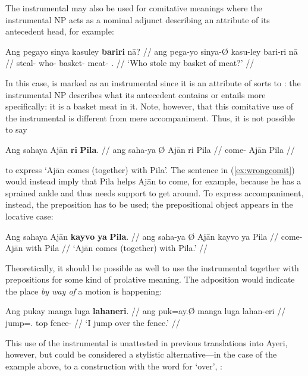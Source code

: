 \xe

The instrumental may also be used for comitative meanings where the
instrumental NP acts as a nominal adjunct describing an attribute of its
antecedent head, for example:

\ex\begingl
	\gla Ang pegayo sinya kasuley \textbf{bariri} nā? //
	\glb ang pega-yo sinya-Ø kasu-ley bari-ri nā //
	\glc \AgtT{} steal-\TsgN{} who-\Top{} basket-\PargI{} 
		meat-\Ins{} \Fsg{}.\Gen{} //
	\glft `Who stole my basket of meat?' //
\endgl\xe

In this case,  is marked as an instrumental since it is an
attribute of sorts to : the instrumental NP describes what its
antecedent contains or entails more specifically: it is a basket  meat
in it. Note, however, that this comitative use of the instrumental is different
from mere accompaniment. Thus, it is not possible to say

\ex\label{ex:wrongcomit}\ljudge* \begingl
	\gla Ang sahaya {} Ajān \textbf{ri} \textbf{Pila}. //
	\glb ang saha-ya Ø Ajān ri Pila //
	\glc \AgtT{} come-\TsgM{} \Top{} Ajān \Ins{} Pila //
\endgl\xe

\noindent to express `Ajān comes (together) with Pila'. The sentence in 
(\ref{ex:wrongcomit}) would instead imply that Pila helps Ajān to come, for 
example, because he has a sprained ankle and thus needs support to get around. 
To express accompaniment, instead, the preposition  has to be used; the prepositional object appears in the locative 
case:

\ex\begingl
	\gla Ang sahaya {} Ajān \textbf{kayvo} \textbf{ya} \textbf{Pila}. //
	\glb ang saha-ya Ø Ajān kayvo ya Pila //
	\glc \AgtT{} come-\TsgM{} \Top{} Ajān with \Loc{} Pila //
	\glft `Ajān comes (together) with Pila.' //
\endgl\xe

Theoretically, it should be possible as well to use the instrumental together 
with prepositions for some kind of prolative meaning. The adposition would 
indicate the place \emph{by way of} a motion is happening:

\ex\begingl
	\gla Ang pukay manga luga \textbf{lahaneri}. //
	\glb ang puk=ay.Ø manga luga lahan-eri //
	\glc \AgtT{} jump=\Fsg{}.\Top{} \Dir{} top fence-\Ins{} //
	\glft `I jump over the fence.' //
\endgl\xe

This use of the instrumental is unattested in previous translations into Ayeri,
however, but could be considered a stylistic alternative---in the case of the
example above, to a construction with the word for `over',
:

